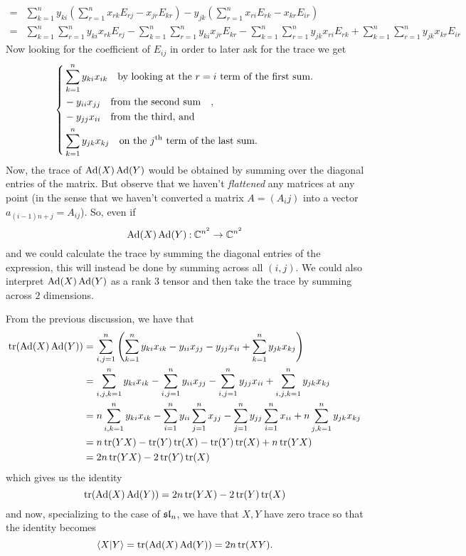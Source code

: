 \documentclass[12pt]{memoir}
\begin{document}
\begin{ptcbr}
\begin{align*}
        =&\sum_{k=1}^n y_{ki}\left(\sum_{r=1}^{n}x_{rk}E_{rj}-x_{jr}E_{kr}\right)-y_{jk}\left(\sum_{r=1}^{n}x_{ri}E_{rk}-x_{kr}E_{ir}\right)\\
        =&\sum_{k=1}^n\sum_{r=1}^{n}y_{ki}x_{rk}E_{rj}-\sum_{k=1}^n\sum_{r=1}^{n}y_{ki}x_{jr}E_{kr}-\sum_{k=1}^n\sum_{r=1}^{n}y_{jk}x_{ri}E_{rk}+\sum_{k=1}^n\sum_{r=1}^{n}y_{jk}x_{kr}E_{ir}
    \end{align*}
    Now looking for the coefficient of $E_{ij}$ in order to later ask for the trace we get
    $$
    \left\lbrace
    \begin{aligned}
        &\sum_{k=1}^ny_{ki}x_{ik}\quad\text{by looking at the }r=i\text{ term of the first sum}.\\
        &-y_{ii}x_{jj}\quad\text{from the second sum}\quad,\\
        &-y_{jj}x_{ii}\quad\text{from the third, and}\quad\\
        &\sum_{k=1}^ny_{jk}x_{kj}\quad\text{on the }j^{\text{th}}\text{ term of the last sum}.
    \end{aligned}
    \right.
    $$
    Now, the trace of $\operatorname{Ad}(X)\operatorname{Ad}(Y)$ would be obtained by summing over the diagonal entries of the matrix. But observe that we haven't \emph{flattened} any matrices at any point (in the sense that we haven't converted a matrix $A=(A_ij)$ into a vector $a_{(i-1)n+j}=A_{ij}$). So, even if 
    $$\operatorname{Ad}(X)\operatorname{Ad}(Y)\mathbin{:}\mathbb{C}^{n^2}\to\mathbb{C}^{n^2}$$
    and we could calculate the trace by summing the diagonal entries of the expression, this will instead be done by summing across all $(i,j)$. We could also interpret $\operatorname{Ad}(X)\operatorname{Ad}(Y)$ as a rank 3 tensor and then take the trace by summing across $2$ dimensions.\par
    From the previous discussion, we have that 
    \begin{align*}
        \tr(\operatorname{Ad}(X)\operatorname{Ad}(Y))&=\sum_{i,j=1}^n\left(\sum_{k=1}^ny_{ki}x_{ik}-y_{ii}x_{jj}-y_{jj}x_{ii}+\sum_{k=1}^ny_{jk}x_{kj}\right)\\
        &=\sum_{i,j,k=1}^ny_{ki}x_{ik}-\sum_{i,j=1}^ny_{ii}x_{jj}-\sum_{i,j=1}^ny_{jj}x_{ii}+\sum_{i,j,k=1}^ny_{jk}x_{kj}\\
        &=n\sum_{i,k=1}^ny_{ki}x_{ik}-\sum_{i=1}^ny_{ii}\sum_{j=1}^nx_{jj}-\sum_{j=1}^ny_{jj}\sum_{i=1}^nx_{ii}+n\sum_{j,k=1}^ny_{jk}x_{kj}\\
        &=n\tr(YX)-\tr(Y)\tr(X)-\tr(Y)\tr(X)+n\tr(YX)\\
        &=2n\tr(YX)-2\tr(Y)\tr(X)
    \end{align*}
    which gives us the identity
    $$\tr(\operatorname{Ad}(X)\operatorname{Ad}(Y))=2n\tr(YX)-2\tr(Y)\tr(X)$$
    and now, specializing to the case of $\mathfrak{sl}_n$, we have that $X,Y$ have zero trace so that the identity becomes
    $$\braket{X}{Y}=\tr(\operatorname{Ad}(X)\operatorname{Ad}(Y))=2n\tr(XY).$$
\end{ptcbr}
\end{document}
